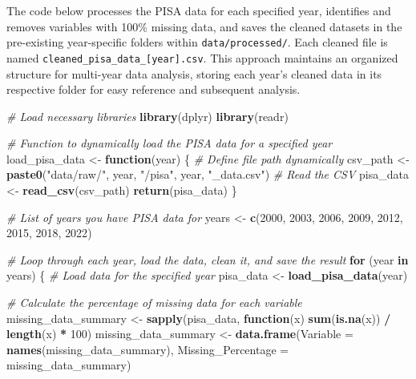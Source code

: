 \documentclass[
]{article}
\newenvironment{Shaded}{\begin{snugshade}}{\end{snugshade}}
\newcommand{\AttributeTok}[1]{\textcolor[rgb]{0.13,0.29,0.53}{#1}}
\newcommand{\CommentTok}[1]{\textcolor[rgb]{0.56,0.35,0.01}{\textit{#1}}}
\newcommand{\ControlFlowTok}[1]{\textcolor[rgb]{0.13,0.29,0.53}{\textbf{#1}}}
\newcommand{\DecValTok}[1]{\textcolor[rgb]{0.00,0.00,0.81}{#1}}
\newcommand{\FunctionTok}[1]{\textcolor[rgb]{0.13,0.29,0.53}{\textbf{#1}}}
\newcommand{\NormalTok}[1]{#1}
\newcommand{\OtherTok}[1]{\textcolor[rgb]{0.56,0.35,0.01}{#1}}
\newcommand{\SpecialCharTok}[1]{\textcolor[rgb]{0.81,0.36,0.00}{\textbf{#1}}}
\newcommand{\StringTok}[1]{\textcolor[rgb]{0.31,0.60,0.02}{#1}}
\begin{document}
The code below processes the PISA data for each specified year,
identifies and removes variables with 100\% missing data, and saves the
cleaned datasets in the pre-existing year-specific folders within
\texttt{data/processed/}. Each cleaned file is named
\texttt{cleaned\_pisa\_data\_{[}year{]}.csv}. This approach maintains an
organized structure for multi-year data analysis, storing each year's
cleaned data in its respective folder for easy reference and subsequent
analysis.

\begin{Shaded}
\begin{Highlighting}[]
\CommentTok{\# Load necessary libraries}
\FunctionTok{library}\NormalTok{(dplyr)}
\FunctionTok{library}\NormalTok{(readr)}

\CommentTok{\# Function to dynamically load the PISA data for a specified year}
\NormalTok{load\_pisa\_data }\OtherTok{\textless{}{-}} \ControlFlowTok{function}\NormalTok{(year) \{}
    \CommentTok{\# Define file path dynamically}
\NormalTok{    csv\_path }\OtherTok{\textless{}{-}} \FunctionTok{paste0}\NormalTok{(}\StringTok{"data/raw/"}\NormalTok{, year, }\StringTok{"/pisa"}\NormalTok{, year, }\StringTok{"\_data.csv"}\NormalTok{)}
    \CommentTok{\# Read the CSV}
\NormalTok{    pisa\_data }\OtherTok{\textless{}{-}} \FunctionTok{read\_csv}\NormalTok{(csv\_path)}
    \FunctionTok{return}\NormalTok{(pisa\_data)}
\NormalTok{\}}

\CommentTok{\# List of years you have PISA data for}
\NormalTok{years }\OtherTok{\textless{}{-}} \FunctionTok{c}\NormalTok{(}\DecValTok{2000}\NormalTok{, }\DecValTok{2003}\NormalTok{, }\DecValTok{2006}\NormalTok{, }\DecValTok{2009}\NormalTok{, }\DecValTok{2012}\NormalTok{, }\DecValTok{2015}\NormalTok{, }\DecValTok{2018}\NormalTok{, }\DecValTok{2022}\NormalTok{)}

\CommentTok{\# Loop through each year, load the data, clean it, and save the result}
\ControlFlowTok{for}\NormalTok{ (year }\ControlFlowTok{in}\NormalTok{ years) \{}
    \CommentTok{\# Load data for the specified year}
\NormalTok{    pisa\_data }\OtherTok{\textless{}{-}} \FunctionTok{load\_pisa\_data}\NormalTok{(year)}
    
    \CommentTok{\# Calculate the percentage of missing data for each variable}
\NormalTok{    missing\_data\_summary }\OtherTok{\textless{}{-}} \FunctionTok{sapply}\NormalTok{(pisa\_data, }\ControlFlowTok{function}\NormalTok{(x) }\FunctionTok{sum}\NormalTok{(}\FunctionTok{is.na}\NormalTok{(x)) }\SpecialCharTok{/} \FunctionTok{length}\NormalTok{(x) }\SpecialCharTok{*} \DecValTok{100}\NormalTok{)}
\NormalTok{    missing\_data\_summary }\OtherTok{\textless{}{-}} \FunctionTok{data.frame}\NormalTok{(}\AttributeTok{Variable =} \FunctionTok{names}\NormalTok{(missing\_data\_summary), }
                                       \AttributeTok{Missing\_Percentage =}\NormalTok{ missing\_data\_summary)}
    

\end{Highlighting}
\end{Shaded}
\end{document}
